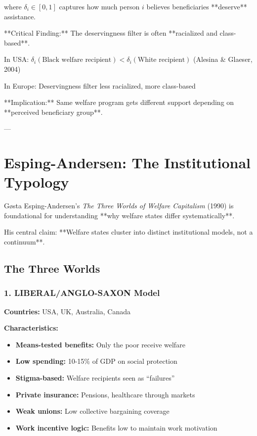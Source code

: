 where $\delta_i \in [0,1]$ captures how much person $i$ believes beneficiaries **deserve** assistance.

**Critical Finding:** The deservingness filter is often **racialized and class-based**.

In USA: $\delta_i(\text{Black welfare recipient}) < \delta_i(\text{White recipient})$ (Alesina \& Glaeser, 2004)

In Europe: Deservingness filter less racialized, more class-based

**Implication:** Same welfare program gets different support depending on **perceived beneficiary group**.

---

\clearpage


\section{Esping-Andersen: The Institutional Typology}
\label{sec:esping-andersen}

Gøsta Esping-Andersen's \emph{The Three Worlds of Welfare Capitalism} (1990) is foundational for understanding **why welfare states differ systematically**.

His central claim: **Welfare states cluster into distinct institutional models, not a continuum**.

\subsection{The Three Worlds}

\subsubsection{1. LIBERAL/ANGLO-SAXON Model}

\textbf{Countries:} USA, UK, Australia, Canada

\textbf{Characteristics:}
\begin{itemize}
\item \textbf{Means-tested benefits:} Only the poor receive welfare
\item \textbf{Low spending:} 10-15\% of GDP on social protection
\item \textbf{Stigma-based:} Welfare recipients seen as ``failures''
\item \textbf{Private insurance:} Pensions, healthcare through markets
\item \textbf{Weak unions:} Low collective bargaining coverage
\item \textbf{Work incentive logic:} Benefits low to maintain work motivation
\end{itemize}

